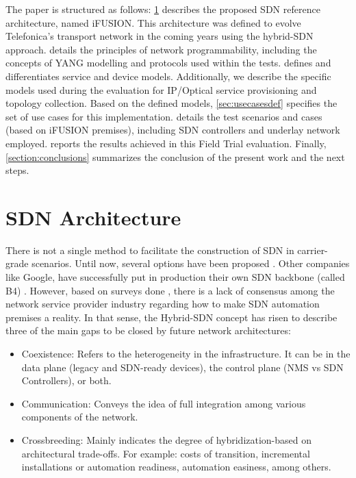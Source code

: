 \documentclass[a4paper,fleqn]{cas-dc}
\begin{document}
The paper is structured as follows: \cref{section:arq} describes the proposed SDN reference architecture, named iFUSION. This architecture was defined to evolve Telefonica's transport network in the coming years using the hybrid-SDN approach.  details the principles of network programmability, including the concepts of YANG modelling and protocols used within the tests.  defines and differentiates service and device models. Additionally, we describe the specific models used during the evaluation for IP/Optical service provisioning and topology collection. Based on the defined models, \cref{sec:usecasesdef} specifies the set of use cases for this implementation.  details the test scenarios and cases (based on iFUSION premises), including SDN controllers and underlay network employed.  reports the results achieved in this Field Trial evaluation. Finally, \cref{section:conclusions} summarizes the conclusion of the present work and the next steps.

\section{SDN Architecture}
\label{section:arq}

There is not a single method to facilitate the construction of SDN in carrier-grade scenarios. Until now, several options have been proposed \cite{bakshi2013considerations,karakus2017survey,birk2016evolving}. Other companies like Google, have successfully put in production their own SDN backbone (called B4) \cite{jain2013b4}. However, based on surveys done  \cite{campbell1999survey,sinha2017survey,boucadair2014software}, there is a lack of consensus among the network service provider industry regarding how to make SDN automation premises a reality. In that sense, the Hybrid-SDN concept has risen to describe three of the main gaps to be closed by future network architectures:
\begin{itemize}
    \item Coexistence: Refers to the heterogeneity in the infrastructure. It can be in the data plane (legacy and SDN-ready devices), the control plane (NMS vs SDN Controllers), or both. 
    \item Communication: Conveys the idea of full integration among various components of the network.
    \item Crossbreeding: Mainly indicates the degree of hybridization-based on architectural trade-offs. For example: costs of transition, incremental installations or automation readiness, automation easiness, among others. 
\end{itemize}
\end{document}
